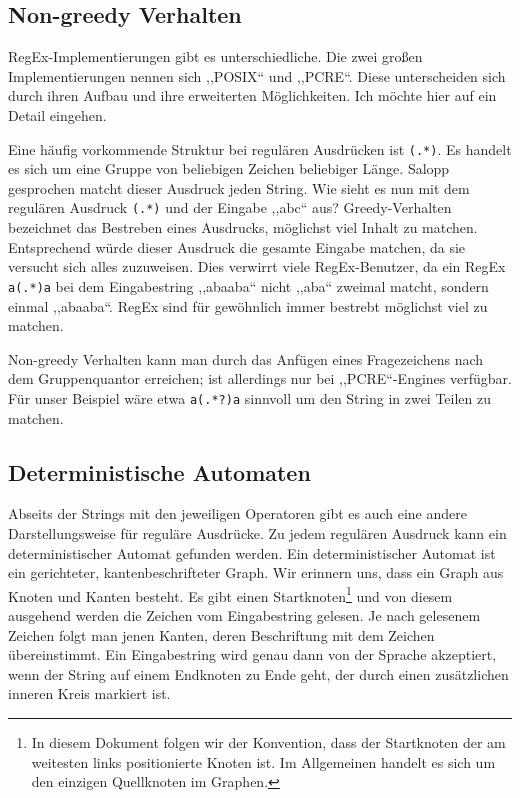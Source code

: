 \subsection{Non-greedy Verhalten}
%
RegEx-Implementierungen gibt es unterschiedliche. Die zwei großen Implementierungen nennen sich ,,POSIX`` und ,,PCRE``. Diese unterscheiden sich durch ihren Aufbau und ihre erweiterten Möglichkeiten. Ich möchte hier auf ein Detail eingehen.

Eine häufig vorkommende Struktur bei regulären Ausdrücken ist \texttt{(.*)}. Es handelt es sich um eine Gruppe von beliebigen Zeichen beliebiger Länge. Salopp gesprochen matcht dieser Ausdruck jeden String.
Wie sieht es nun mit dem regulären Ausdruck \texttt{(.*)} und der Eingabe ,,abc`` aus? Greedy-Verhalten bezeichnet das Bestreben eines Ausdrucks, möglichst viel Inhalt zu matchen. Entsprechend würde dieser Ausdruck die gesamte Eingabe matchen, da sie versucht sich alles zuzuweisen. Dies verwirrt viele RegEx-Benutzer, da ein RegEx \texttt{a(.*)a} bei dem Eingabestring ,,abaaba`` nicht ,,aba`` zweimal matcht, sondern einmal ,,abaaba``. RegEx sind für gewöhnlich immer bestrebt möglichst viel zu matchen.

Non-greedy Verhalten kann man durch das Anfügen eines Fragezeichens nach dem Gruppenquantor erreichen; ist allerdings nur bei ,,PCRE``-Engines verfügbar. Für unser Beispiel wäre etwa \texttt{a(.*?)a} sinnvoll um den String in zwei Teilen zu matchen.

\subsection{Deterministische Automaten}
%
Abseits der Strings mit den jeweiligen Operatoren gibt es auch eine andere Darstellungsweise für reguläre Ausdrücke. Zu jedem regulären Ausdruck kann ein deterministischer Automat gefunden werden. Ein deterministischer Automat ist ein gerichteter, kantenbeschrifteter Graph. Wir erinnern uns, dass ein Graph aus Knoten und Kanten besteht. Es gibt einen Startknoten\footnote{In diesem Dokument folgen wir der Konvention, dass der Startknoten der am weitesten links positionierte Knoten ist. Im Allgemeinen handelt es sich um den einzigen Quellknoten im Graphen.} und von diesem ausgehend werden die Zeichen vom Eingabestring gelesen. Je nach gelesenem Zeichen folgt man jenen Kanten, deren Beschriftung mit dem Zeichen übereinstimmt. Ein Eingabestring wird genau dann von der Sprache akzeptiert, wenn der String auf einem Endknoten zu Ende geht, der durch einen zusätzlichen inneren Kreis markiert ist.

